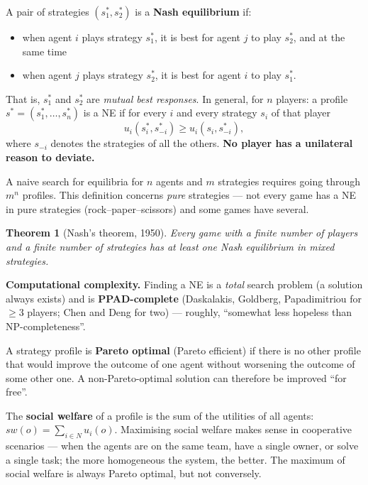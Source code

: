 \documentclass[11pt,a4paper]{article}
\newtheorem{theorem}{Theorem}[section]
\theoremstyle{definition}
\providecommand{\uv}[1]{``#1''}
\begin{document}
\begin{defbox}
A pair of strategies $(s_1^*, s_2^*)$ is a \textbf{Nash equilibrium} if:
\begin{itemize}
\item when agent $i$ plays strategy $s_1^*$, it is best for agent $j$ to play $s_2^*$, and at the same
  time
\item when agent $j$ plays strategy $s_2^*$, it is best for agent $i$ to play $s_1^*$.
\end{itemize}
That is, $s_1^*$ and $s_2^*$ are \emph{mutual best responses}.
In general, for $n$ players: a profile $s^* = (s_1^*,\dots,s_n^*)$ is a NE if for every $i$ and every
strategy $s_i$ of that player
\[
u_i(s_i^*, s_{-i}^*) \ge u_i(s_i, s_{-i}^*),
\]
where $s_{-i}$ denotes the strategies of all the others. \textbf{No player has a unilateral reason to
deviate.}

A naive search for equilibria for $n$ agents and $m$ strategies requires going through $m^n$ profiles.
This definition concerns \emph{pure} strategies --- not every game has a NE in pure strategies
(rock--paper--scissors) and some games have several.
\end{defbox}

\begin{theorem}[Nash's theorem, 1950]
Every game with a finite number of players and a finite number of strategies has at least one Nash
equilibrium \emph{in mixed strategies}.
\end{theorem}

\textbf{Computational complexity.} Finding a NE is a \emph{total} search problem (a solution
always exists) and is \textbf{PPAD-complete} (Daskalakis, Goldberg, Papadimitriou for $\ge 3$
players; Chen and Deng for two) --- roughly, \uv{somewhat less hopeless than NP-completeness}.

\begin{defbox}
A strategy profile is \textbf{Pareto optimal} (Pareto efficient) if there is no other profile that
would improve the outcome of one agent without worsening the outcome of some other one.
A non-Pareto-optimal solution can therefore be improved \uv{for free}.

The \textbf{social welfare} of a profile is the sum of the utilities of all agents:
$\mathit{sw}(o) = \sum_{i \in N} u_i(o)$. Maximising social welfare makes sense
in cooperative scenarios --- when the agents are on the same team, have a single owner, or solve a
single task; the more homogeneous the system, the better. The maximum of social welfare is always
Pareto optimal, but not conversely.
\end{defbox}
\end{document}
